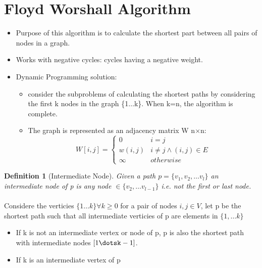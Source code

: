 \documentclass[12pt,letterpaper]{article}
\newtheorem{definition}{Definition}[section]
\begin{document}
\section{Floyd Worshall Algorithm}
\begin{itemize}
\item Purpose of this algorithm is to calculate the shortest part between all pairs of nodes in a graph. 
\item Works with negative cycles: cycles having a negative weight.
\item Dynamic Programming solution:
\begin{itemize}
\item consider the subproblems of calculating the shortest paths by considering the first k nodes in the graph \{1$\dots$k\}. When k=n, the algorithm is complete. 
\item The graph is represented as an adjacency matrix W n$\times$n:
\[W[i,j]=\begin{cases}0 & i=j\\ w(i,j) & i\neq j \wedge (i,j)\in E \\ \infty & otherwise \end{cases}\]
\end{itemize}
\end{itemize}
\begin{definition}[Intermediate Node]\hfill \break
Given a path $p=\{v_1,v_2,\dots v_l\}$ an intermediate node of p is any node $\in \{v_2,\dots v_{l-1}\}$ i.e. not the first or last node. 
\end{definition}
\paragraph{ }Considere the verticies $\{1\dots k\} \forall k \geq 0$ for a pair of nodes $i,j\in V$, let p be the shortest path such that all intermediate verticies of p are elements in $\{1,\dots k\}$
\begin{itemize}
\item If k is not an intermediate vertex or node of p, p is also the shortest path with intermediate nodes $[1\dotsk-1]$.
\item If k is an intermediate vertex of p 
\end{itemize}
\end{document}

